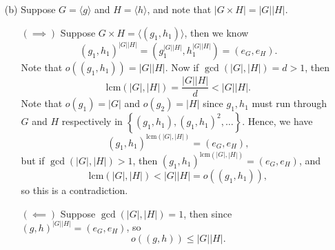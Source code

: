 \documentclass[12pt]{article}
\begin{document}
\begin{enumerate}
\begin{itemize}
        \item [(b)] Suppose \(G = \langle g \rangle \) and \(H = \langle h \rangle \), and note that \(\left\vert G \times H \right\vert = \left\vert G \right\vert \left\vert H \right\vert   \). 
        \begin{itemize}
            \item [\((\implies )\)] Suppose \(G \times H = \langle (g_1, h_1) \rangle \), then we know
            \[
                \left( g_1, h_1 \right)^{\left\vert G \right\vert \left\vert H \right\vert  } = \left( g_1^{\left\vert G \right\vert \left\vert H \right\vert}, h_1^{\left\vert G \right\vert \left\vert H \right\vert} \right) = (e_G, e_H).
            \] Note that \(o \left( (g_1, h_1) \right) = \left\vert G \right\vert \left\vert H \right\vert   \). Now if \(\gcd \left( \left\vert G \right\vert, \left\vert H \right\vert   \right) = d > 1 \), then 
            \[
                \mathrm{lcm}  \left( \left\vert G \right\vert, \left\vert H \right\vert   \right) = \frac{\left\vert G \right\vert \left\vert H \right\vert  }{d} < \left\vert G \right\vert \left\vert H \right\vert.    
            \]
            Note that \(o(g_1) = \left\vert G \right\vert \) and \(o(g_2) = \left\vert H \right\vert \) since \(g_1, h_1\) must run through \(G\) and \(H\) respectively in \(\left\{ (g_1, h_1), (g_1, h_1)^2, \dots  \right\} \). Hence, we have 
            \[
                \left( g_1, h_1 \right)^{\mathrm{lcm} \left( \left\vert G \right\vert, \left\vert H \right\vert   \right)  } = (e_G, e_H),
            \] but if \(\gcd \left( \left\vert G \right\vert, \left\vert H \right\vert   \right) > 1 \), then \((g_1, h_1)^{\mathrm{lcm} \left( \vert G \vert, \left\vert H \right\vert   \right)  } = (e_G, e_H)\), and
            \[
                \mathrm{lcm} \left( \left\vert G \right\vert, \left\vert H \right\vert   \right) < \left\vert G \right\vert \left\vert H \right\vert = o \left( (g_1, h_1) \right),  
            \]
            so this is a contradiction.  
            \item [\((\impliedby )\)] Suppose \(\gcd \left( \left\vert G \right\vert, \left\vert H \right\vert   \right) = 1 \), then since \((g, h)^{\left\vert G \right\vert \left\vert H \right\vert  } = (e_G, e_H)\), so
            \[
                o \left( (g, h) \right) \le \left\vert G \right\vert \left\vert H \right\vert.
\]
\end{itemize}
\end{itemize}
\end{enumerate}
\end{document}
